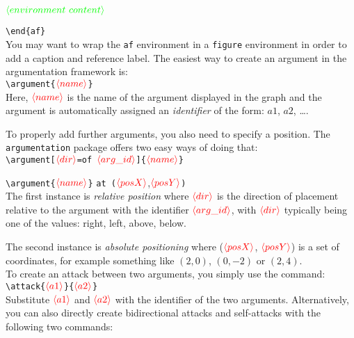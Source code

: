 \documentclass{article}
\newcommand{\argumentation}{\texttt{argumentation}\xspace}
\newcommand{\opt}[2][red]{\ensuremath{\textcolor{#1}{\langle #2\rangle}}}
\begin{document}
\quad\opt[green]{environment~content}

\verb|\end{af}|\\

\noindent
You may want to wrap the \texttt{af} environment in a \texttt{figure} environment in order to add a caption and reference label.
The easiest way to create an argument in the argumentation framework is:\\

\vspace{-0.3cm}
\verb|\argument{|\opt{name}\verb|}|\\

\noindent
Here, \opt{name} is the name of the argument displayed in the graph and the argument is automatically assigned an \emph{identifier} of the form: $a1$, $a2$, \dots.

To properly add further arguments, you also need to specify a position.
The \argumentation package offers two easy ways of doing that:\\

\vspace{-0.3cm}
\verb|\argument[|\opt{dir}\verb|=of |\opt{arg\_id}\verb|]{|\opt{name}\verb|}|

\verb|\argument{|\opt{name}\verb|}| \verb|at (|\opt{posX},\opt{posY}\verb|)|\\

\noindent
The first instance is \emph{relative position} where \opt{dir} is the direction of placement relative to the argument with the identifier \opt{arg\_id}, with \opt{dir} typically being one of the values: \textsf{right}, \textsf{left}, \textsf{above}, \textsf{below}.

The second instance is \emph{absolute positioning} where (\opt{posX}, \opt{posY}) is a set of coordinates, for example something like $(2, 0)$, $(0, -2)$ or $(2, 4)$.\\

\noindent
To create an attack between two arguments, you simply use the command:\\

\vspace{-0.3cm}
\verb|\attack{|\opt{a1}\verb|}{|\opt{a2}\verb|}|\\

\noindent
Substitute \opt{a1} and \opt{a2} with the identifier of the two arguments.
Alternatively, you can also directly create bidirectional attacks and self-attacks with the following two commands:\\
\end{document}
